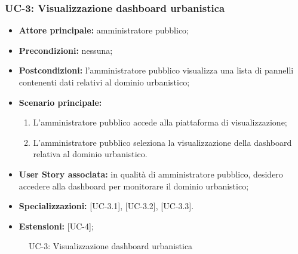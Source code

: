 \documentclass[8pt]{article}
\begin{document}
\subsubsection*{UC-3: Visualizzazione dashboard urbanistica}
\begin{itemize}
    \item \textbf{Attore principale:} amministratore pubblico;
    \item \textbf{Precondizioni: }nessuna;
    \item \textbf{Postcondizioni:} l'amministratore pubblico visualizza una lista di pannelli
        contenenti dati relativi al dominio urbanistico;
    \item \textbf{Scenario principale:} 
    \begin{enumerate}
    \item L’amministratore pubblico accede alla piattaforma di visualizzazione;
    \item L’amministratore pubblico seleziona la visualizzazione della dashboard relativa al dominio
        urbanistico.
    \end{enumerate}
    \item \textbf{User Story associata:} in qualità di amministratore pubblico, desidero accedere
        alla dashboard per monitorare il dominio urbanistico;
    \item \textbf {Specializzazioni:} [UC-3.1], [UC-3.2], [UC-3.3].
    \item \textbf{Estensioni:} [UC-4];
\end{itemize}

\begin{figure}[ht!]
    \centering
    \caption{UC-3: Visualizzazione dashboard urbanistica}
    \label{fig:UC-3: Visualizzazione dashboard urbanistica}
\end{figure}
\end{document}
